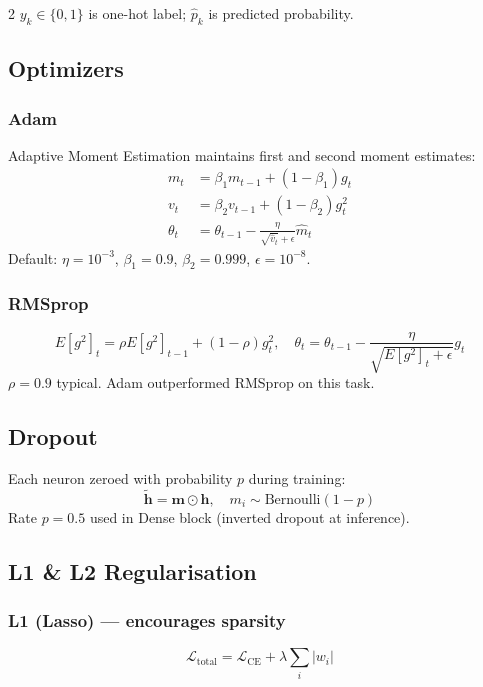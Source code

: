 \documentclass[10pt, a4paper]{article}
\begin{document}
\begin{multicols}{2}
$y_k \in \{0,1\}$ is one-hot label; $\hat{p}_k$ is predicted probability.

\subsection{Optimizers}

\subsubsection{Adam}
Adaptive Moment Estimation maintains first and second moment estimates:
\begin{align}
m_t &= \beta_1 m_{t-1} + (1-\beta_1)g_t \\
v_t &= \beta_2 v_{t-1} + (1-\beta_2)g_t^2 \\
\theta_t &= \theta_{t-1} - \frac{\eta}{\sqrt{\hat{v}_t}+\epsilon}\hat{m}_t
\end{align}
Default: $\eta=10^{-3}$, $\beta_1=0.9$, $\beta_2=0.999$, $\epsilon=10^{-8}$.

\subsubsection{RMSprop}
\begin{equation}
E[g^2]_t = \rho E[g^2]_{t-1} + (1{-}\rho)g_t^2, \quad
\theta_t = \theta_{t-1} - \frac{\eta}{\sqrt{E[g^2]_t + \epsilon}} g_t
\end{equation}
$\rho=0.9$ typical. Adam outperformed RMSprop on this task.

\subsection{Dropout}
Each neuron zeroed with probability $p$ during training:
\begin{equation}
\tilde{\mathbf{h}} = \mathbf{m} \odot \mathbf{h}, \quad
m_i \sim \text{Bernoulli}(1-p)
\end{equation}
Rate $p = 0.5$ used in Dense block (inverted dropout at inference).

\subsection{L1 \& L2 Regularisation}

\subsubsection{L1 (Lasso) --- encourages sparsity}
\begin{equation}
\mathcal{L}_{\text{total}} = \mathcal{L}_{\text{CE}} + \lambda \sum_i |w_i|
\end{equation}


\end{multicols}
\end{document}
